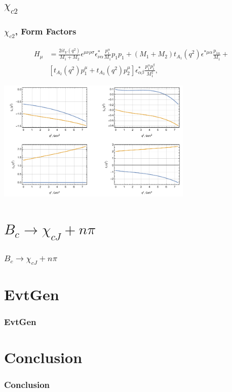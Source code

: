 \documentclass{beamer}
\begin{document}
\subsection{$\chi_{c2}$}
\begin{frame}
  \frametitle{$\chi_{c2}$, Form Factors}
  \begin{align*}
  H_\mu &=
\frac{2it_V(q^2)}{M_1+M_2} \epsilon^{\mu\nu\rho\sigma}\epsilon^*_{\nu\alpha}
          \frac{p_1^\alpha}{M_1}  p_1 p_1  
     +  (M_1+M_2)t_{A_1}(q^2)\epsilon^{*\mu\alpha}\frac{p_{1\alpha}}{M_1} +\\
&  [t_{A_2}(q^2)p_1^\mu+t_{A_3}(q^2)p_2^\mu]\epsilon^*_{\alpha\beta}
\frac{p_1^\alpha p_1^\beta}{M_1^2} , 
  \end{align*}

\begin{center}
  \includegraphics[width=0.7\textwidth]{figs/ff_chi_c2}
\end{center}

\end{frame}



  
\section{$B_c\to \chi_{cJ}+n\pi$}
\begin{frame}
  \frametitle{$B_c\to \chi_{cJ}+n\pi$}
\end{frame}

\section{EvtGen}
\begin{frame}
  \frametitle{EvtGen}
\end{frame}


\section{Conclusion}
\begin{frame}
  \frametitle{Conclusion}
\end{frame}
\end{document}
